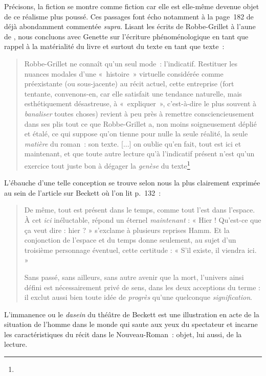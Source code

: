 \documentclass[12pt, a4paper]{article}
\begin{document}
Précisons, la fiction se montre comme fiction car elle est elle-même devenue objet de ce réalisme plus poussé. %
Ces passages font écho notamment à la page~182 de \punr{} déjà abondamment commentée \textit{supra}.
Lisant les écrits de Robbe-Grillet à l'aune de \punr{}, nous concluons avec Genette sur l'écriture phénoménologique en tant que rappel à la matérialité du livre et surtout du texte en tant que texte~: 
\begin{quote}
    Robbe-Grillet ne connaît qu'un seul mode~: l'indicatif. Restituer les nuances modales d'une «~histoire~» virtuelle considérée comme préexistante (ou sous-jacente) au récit actuel, cette entreprise (fort tentante, convenons-en, car elle satisfait une tendance naturelle, mais esthétiquement désastreuse, à «~expliquer~», c'est-à-dire le plus souvent à \textit{banaliser} toutes choses) revient à peu près à remettre consciencieusement dans ses plis tout ce que Robbe-Grillet a, non moins soigneusement déplié et étalé, ce qui suppose qu'on tienne pour nulle la seule réalité, la seule \textit{matière} du roman~: son texte. [...] on oublie qu'en fait, tout est ici et maintenant, et que toute autre lecture qu'à l'indicatif présent n'est qu'un exercice tout juste bon à dégager la \textit{genèse} du texte\footnote{}
\end{quote}
L'ébauche d'une telle conception se trouve selon nous la plus clairement exprimée au sein de l'article sur Beckett où l'on lit p.~132~:
\begin{quote}
    De même, tout est présent dans le temps, comme tout l’est dans l’espace. À cet \textit{ici} inéluctable, répond un éternel \textit{maintenant} : « Hier ! Qu’est-ce que ça veut dire : hier ? » s’exclame à plusieurs reprises Hamm. Et la conjonction de l’espace et du temps donne seulement, au sujet d’un troisième personnage éventuel, cette certitude : « S’il existe, il viendra ici. »

    Sans passé, sans ailleurs, sans autre avenir que la mort, l’univers ainsi défini est nécessairement privé de sens, dans les deux acceptions du terme : il exclut aussi bien toute idée de \textit{progrès} qu’une quelconque \textit{signification}.
\end{quote}
L'immanence ou le \textit{dasein} du théâtre de Beckett est une illustration en acte de la situation de l'homme dans le monde qui saute aux yeux du spectateur et incarne les caractéristiques du récit dans le Nouveau-Roman~: objet, lui aussi, de la lecture.
\end{document}

